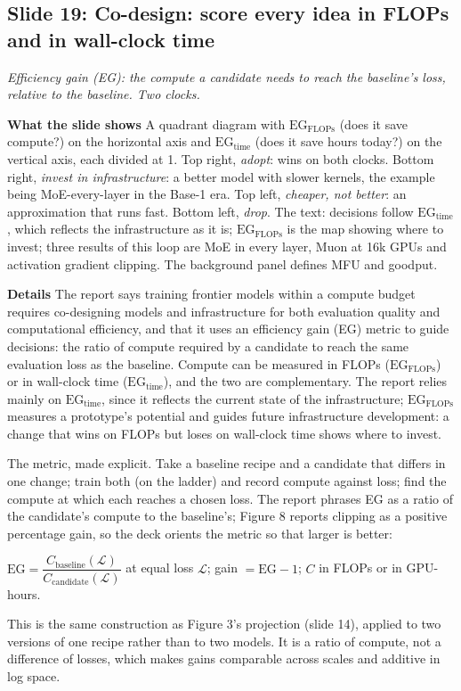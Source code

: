 \documentclass[11pt,letterpaper]{article}
\newcommand{\slide}[3]{%
  \subsection[Slide #1: #2]{Slide #1: #2}%
  {\color{muted}\itshape #3\par}\medskip}
\newcommand{\para}[1]{\medskip\noindent\textbf{#1}\quad}
\newenvironment{formulas}{\begin{tcolorbox}[formulabox]}{\end{tcolorbox}}
\begin{document}
\slide{19}{Co-design: score every idea in FLOPs and in wall-clock time}{Efficiency gain (EG): the compute a candidate needs to reach the baseline's loss, relative to the baseline. Two clocks.}

\para{What the slide shows} A quadrant diagram with $\text{EG}_{\text{FLOPs}}$ (does it save compute?) on the horizontal axis and $\text{EG}_{\text{time}}$ (does it save hours today?) on the vertical axis, each divided at 1. Top right, \emph{adopt}: wins on both clocks. Bottom right, \emph{invest in infrastructure}: a better model with slower kernels, the example being MoE-every-layer in the Base-1 era. Top left, \emph{cheaper, not better}: an approximation that runs fast. Bottom left, \emph{drop}. The text: decisions follow $\text{EG}_{\text{time}}$, which reflects the infrastructure as it is; $\text{EG}_{\text{FLOPs}}$ is the map showing where to invest; three results of this loop are MoE in every layer, Muon at 16k GPUs and activation gradient clipping. The background panel defines MFU and goodput.

\para{Details} The report says training frontier models within a compute budget requires co-designing models and infrastructure for both evaluation quality and computational efficiency, and that it uses an efficiency gain (EG) metric to guide decisions: the ratio of compute required by a candidate to reach the same evaluation loss as the baseline. Compute can be measured in FLOPs ($\text{EG}_{\text{FLOPs}}$) or in wall-clock time ($\text{EG}_{\text{time}}$), and the two are complementary. The report relies mainly on $\text{EG}_{\text{time}}$, since it reflects the current state of the infrastructure; $\text{EG}_{\text{FLOPs}}$ measures a prototype's potential and guides future infrastructure development: a change that wins on FLOPs but loses on wall-clock time shows where to invest.

The metric, made explicit. Take a baseline recipe and a candidate that differs in one change; train both (on the ladder) and record compute against loss; find the compute at which each reaches a chosen loss. The report phrases EG as a ratio of the candidate's compute to the baseline's; Figure 8 reports clipping as a positive percentage gain, so the deck orients the metric so that larger is better:
\begin{formulas}
$\text{EG}=\dfrac{C_{\text{baseline}}(\mathcal{L})}{C_{\text{candidate}}(\mathcal{L})}$ at equal loss $\mathcal{L}$; \quad gain $=\text{EG}-1$; \quad $C$ in FLOPs or in GPU-hours.
\end{formulas}
This is the same construction as Figure 3's projection (slide 14), applied to two versions of one recipe rather than to two models. It is a ratio of compute, not a difference of losses, which makes gains comparable across scales and additive in log space.
\end{document}
